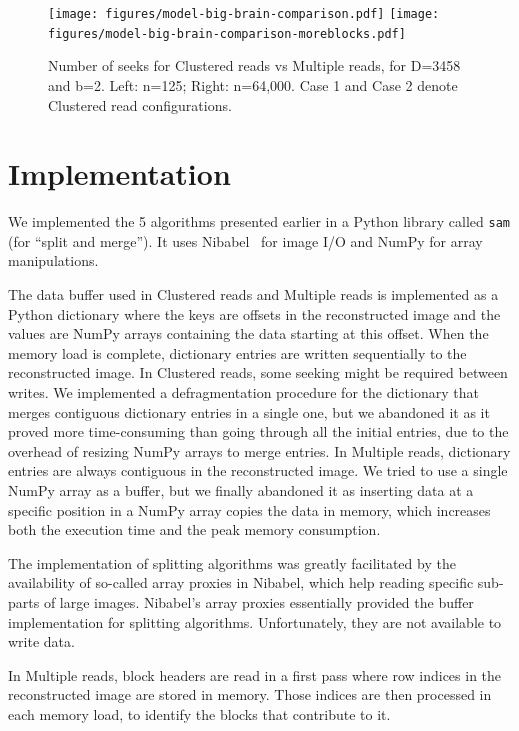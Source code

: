 \documentclass[10pt, conference, compsocconf]{IEEEtran}
\begin{document}
\begin{figure}
  \texttt{[image: figures/model-big-brain-comparison.pdf]}
  \texttt{[image: figures/model-big-brain-comparison-moreblocks.pdf]}
  \caption{Number of seeks for Clustered reads vs Multiple reads, for
    D=3458 and b=2. Left: n=125; Right: n=64,000. Case 1 and Case 2
    denote Clustered read configurations.}
  \label{fig:model-comparison}
\end{figure}

\section{Implementation}
\label{sec:implementation}

We implemented the 5 algorithms presented earlier in a
Python library called \texttt{sam} (for ``split and merge''). It uses
Nibabel~\cite{matthew_brett_2016_60808} for image I/O and NumPy for
array manipulations.

The data buffer used in Clustered reads and Multiple reads is
implemented as a Python dictionary where the keys are offsets in the
reconstructed image and the values are NumPy arrays containing the
data starting at this offset. When the memory load is complete,
dictionary entries are written sequentially to the reconstructed
image. In Clustered reads, some seeking might be required between
writes. We implemented a defragmentation procedure for the dictionary
that merges contiguous dictionary entries in a single one, but we
abandoned it as it proved more time-consuming than going through all
the initial entries, due to the overhead of resizing NumPy arrays to
merge entries. In Multiple reads, dictionary entries are always
contiguous in the reconstructed image.  We tried to use a single NumPy
array as a buffer, but we finally abandoned it as inserting data at a
specific position in a NumPy array copies the data in memory, which
increases both the execution time and the peak memory consumption.

The implementation of splitting algorithms was greatly facilitated by
the availability of so-called array proxies in Nibabel, which help
reading specific sub-parts of large images. Nibabel's array proxies
essentially provided the buffer implementation for splitting
algorithms. Unfortunately, they are not available to write
data. 

In Multiple reads, block headers are read in a first pass where row
indices in the reconstructed image are stored in memory. Those indices
are then processed in each memory load, to identify the blocks that
contribute to it.
\end{document}
